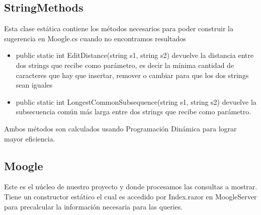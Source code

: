 \documentclass[a4paper,12pt]{article}
\begin{document}
\subsection{StringMethods}\label{sub:string}
Esta clase estática contiene los métodos necesarios para poder construir la sugerencia en
Moogle.cs cuando no encontramos resultados

\begin{itemize}
    \item public static int EditDistance(string s1, string s2) devuelve la distancia entre dos strings que recibe como
    parámetro, es decir la mínima cantidad de caracteres que hay que insertar,
    remover o cambiar para que los dos strings sean iguales
    \item public static int LongestCommonSubsequence(string s1, string s2) devuelve la subsecuencia común más larga entre
    dos strings que recibe como parámetro.
\end{itemize}

Ambos métodos son calculados usando Programación Dinámica para lograr mayor eficiencia.

\subsection{Moogle}\label{sub:moogle}
Este es el núcleo de nuestro proyecto y donde procesamos las consultas a mostrar.
Tiene un constructor estático el cual es accedido por Index.razor en MoogleServer para
precalcular la información necesaria para las queries.
\end{document}
